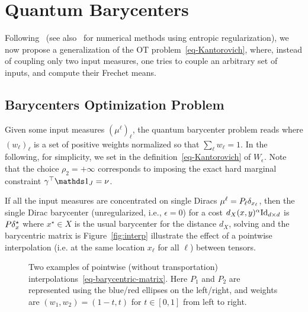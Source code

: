 

\section{Quantum Barycenters}
\label{sec-q-bary}

Following~\cite{agueh-2011} (see also~\cite{benamou-2015,solomon-2015} for numerical methods using entropic regularization), we now propose a generalization of the OT problem~\eqref{eq-Kantorovich}, where, instead of coupling only two input measures, one tries to couple an arbitrary set of inputs, and compute their Frechet means. 

\newcommand{\weight}{w}

\subsection{Barycenters Optimization Problem}

Given some input measures $(\mu^\ell)_\ell$, the quantum barycenter problem reads
\eql{\label{eq-defn-barycenters}
	\umin{\nu} \sum_\ell \weight_\ell W_\epsilon(\mu^\ell,\nu), 
}
where $(\weight_\ell)_\ell$ is a set of positive weights normalized so that $\sum_\ell \weight_\ell=1$. In the following, for simplicity, we set
in the definition~\eqref{eq-Kantorovich} of $W_\epsilon$. Note that the choice $\rho_2=+\infty$ corresponds to imposing the exact hard marginal constraint $\gamma^\top \ones_J=\nu$. 

\begin{rem}
	If all the input measures are concentrated on single Diracs $\mu^\ell=P_\ell \delta_{x_\ell}$, then the single Dirac barycenter (unregularized, i.e., $\epsilon=0$) for a cost $d_X(x,y)^\alpha \mathrm{Id}_{d \times d}$ is $P \delta_x^\star$ where $x^\star \in X$ is the usual barycenter for the distance $d_X$, solving 
	\eq{
		x^\star \in \argmin_{x} 
			\Ee(x) = \sum_\ell \weight_\ell d_X^\al(x_\ell,x) 
	}
	and the barycentric matrix is
	\eql{\label{eq-barycentric-matrix}
		P = e^{-\frac{\Ee(x^\star)}{\rho}} \exp\Big(\sum_{\ell} \weight_\ell \log(P_\ell)\Big).
	}
	Figure~\eqref{fig:interp} illustrate the effect of a pointwise interpolation (i.e. at the same location $x_\ell$ for all $\ell$) between tensors.
\end{rem}


\begin{figure}\centering
{}
\caption{Two examples of pointwise (without transportation) interpolations~\eqref{eq-barycentric-matrix}. Here $P_1$ and $P_2$ are represented using the blue/red ellipses on the left/right, and weights are $(w_1,w_2)=(1-t,t)$ for $t \in [0,1]$ from left to right.} \label{fig:interp}
\end{figure}



